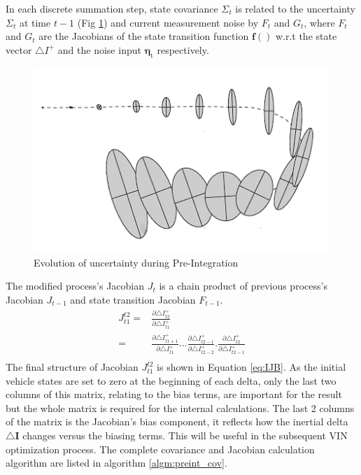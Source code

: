 \documentclass[12pt]{article}   %
\begin{document}
In each discrete summation step, state covariance $\Sigma_t$ is related to the uncertainty $\Sigma_t$ at time $t-1$ (Fig \ref{fig:preintUncertainty}) and current measurement noise by $F_t$ and $G_t$, where $F_t$ and $G_t$ are the Jacobians of the state transition function $\bm{f}()$ w.r.t the state vector $\triangle I^+$ and the noise input $\mathrm{\bm{\eta}_t}$ respectively.
\begin{figure}[h!]
	\includegraphics[height=7cm]{figures/Inertial-delta_covariance_evolution.png}
	\caption{Evolution of uncertainty during Pre-Integration}
	\label{fig:preintUncertainty}
\end{figure}

The modified process's Jacobian $J_{t}$ is a chain product of previous process's Jacobian $J_{t-1}$ and state transition Jacobian $F_{t-1}$. 
\begin{equation}
	\begin{split}
J^{t2}_{t1} =&\frac {\partial \triangle I^+_{t2}}{\partial \triangle I^+_{t1}}\\
= & \frac {\partial \triangle I^+_{t1+1}}{\partial \triangle I^+_{t1}} ... \frac {\partial \triangle I^+_{t2-1}}{\partial \triangle I^+_{t2-2}} . \frac {\partial \triangle I^+_{t2}}{\partial \triangle I^+_{t2-1}} \\
\end{split}
\end{equation}
The final structure of Jacobian $J^{t2}_{t1}$ is shown in Equation \ref{eq:IJB}. As the initial vehicle states are set to zero at the beginning of each delta, only the last two columns of this matrix, relating to the bias terms, are important for the result but the whole matrix is required for the internal calculations. The last 2 columns of the matrix is the Jacobian's bias component, it reflects how the inertial delta $\triangle \bm{I}$ changes versus the biasing terms. This will be useful in the subsequent VIN optimization process. The complete covariance and Jacobian calculation algorithm are listed in algorithm \ref{algm:preint_cov}. \\
\end{document}
